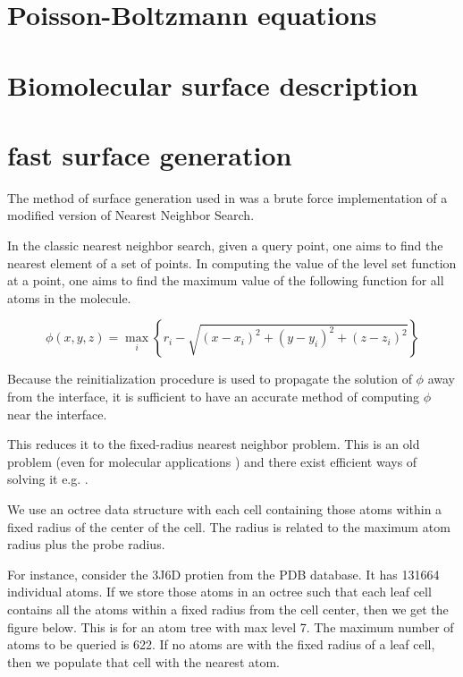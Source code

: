 \documentclass{elsarticle}
\theoremstyle{own}
\begin{document}
\section{Poisson-Boltzmann equations}

\section{Biomolecular surface description}

\section{fast surface generation}


The method of surface generation used in \cite{MirzadehTheillardHelgadottirEtAl:12:AdaptiveFiniteDifference} was a brute force implementation of a modified version of Nearest Neighbor Search. 

In the classic nearest neighbor search, given a query point, one aims to find the nearest element of a set of points. In computing the value of the level set function at a point, one aims to find the maximum value of the following function for all atoms in the molecule. 

\begin{equation*}
\phi(x,y,z) = \max_i\left\lbrace r_i - \sqrt{(x-x_i)^2 + (y-y_i)^2 + (z-z_i)^2} \right\rbrace
\end{equation*}

Because the reinitialization procedure is used to propagate the solution of $\phi$ away from the interface, it is sufficient to have an accurate method of computing $\phi$ near the interface. 

This reduces it to the fixed-radius nearest neighbor problem. This is an old problem (even for molecular applications \cite{Levinthal:66:Molecular-model-buil}) and there exist efficient ways of solving it e.g. \cite{Bentley:75:A-Survey-of-techniqu,Bentley;Stanat;Williams:77:The-complexity-of-fi}.

We use an octree data structure with each cell containing those atoms within a fixed radius of the center of the cell. The radius is related to the maximum atom radius plus the probe radius. 



For instance, consider the 3J6D protien from the PDB database. It has 131664 individual atoms. If we store those atoms in an octree such that each leaf cell contains all the atoms within a fixed radius from the cell center, then we get the figure below. This is for an atom tree with max level 7. The maximum number of atoms to be queried is 622. If no atoms are with the fixed radius of a leaf cell, then we populate that cell with the nearest atom.
\end{document}
